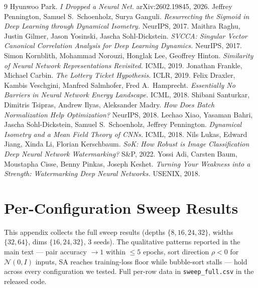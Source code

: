 \documentclass[10pt]{article}
\theoremstyle{remark}
\begin{document}
\begin{thebibliography}{9}
 Hyunwoo Park. \emph{I Dropped a Neural Net.} arXiv:2602.19845, 2026.
 Jeffrey Pennington, Samuel S.\ Schoenholz, Surya Ganguli.
  \emph{Resurrecting the Sigmoid in Deep Learning through Dynamical Isometry.} NeurIPS, 2017.
 Maithra Raghu, Justin Gilmer, Jason Yosinski, Jascha Sohl-Dickstein.
  \emph{SVCCA: Singular Vector Canonical Correlation Analysis for Deep Learning Dynamics.} NeurIPS, 2017.
 Simon Kornblith, Mohammad Norouzi, Honglak Lee, Geoffrey Hinton.
  \emph{Similarity of Neural Network Representations Revisited.} ICML, 2019.
 Jonathan Frankle, Michael Carbin.
  \emph{The Lottery Ticket Hypothesis.} ICLR, 2019.
 Felix Draxler, Kambis Veschgini, Manfred Salmhofer, Fred A.~Hamprecht.
  \emph{Essentially No Barriers in Neural Network Energy Landscape.} ICML, 2018.
 Shibani Santurkar, Dimitris Tsipras, Andrew Ilyas, Aleksander Madry.
  \emph{How Does Batch Normalization Help Optimization?} NeurIPS, 2018.
 Lechao Xiao, Yasaman Bahri, Jascha Sohl-Dickstein, Samuel S.\ Schoenholz, Jeffrey Pennington.
  \emph{Dynamical Isometry and a Mean Field Theory of CNNs.} ICML, 2018.
 Nils Lukas, Edward Jiang, Xinda Li, Florian Kerschbaum.
  \emph{SoK: How Robust is Image Classification Deep Neural Network Watermarking?} S\&P, 2022.
 Yossi Adi, Carsten Baum, Moustapha Cisse, Benny Pinkas, Joseph Keshet.
  \emph{Turning Your Weakness into a Strength: Watermarking Deep Neural Networks.} USENIX, 2018.
\end{thebibliography}

\appendix

\section{Per-Configuration Sweep Results}
\label{app:sweep}

This appendix collects the full sweep results (depths
$\{8,16,24,32\}$, widths $\{32,64\}$, dims $\{16,24,32\}$, 3 seeds).
The qualitative patterns reported in the main text --- pair accuracy
$\to 1$ within $\leq 5$ epochs, sort direction $\rho<0$ for
$\mathcal{N}(0,I)$ inputs, SA reaches training-loss floor while
bubble-sort stalls --- hold across every configuration we tested.
Full per-row data in \texttt{sweep\_full.csv} in the released code.
\end{document}
